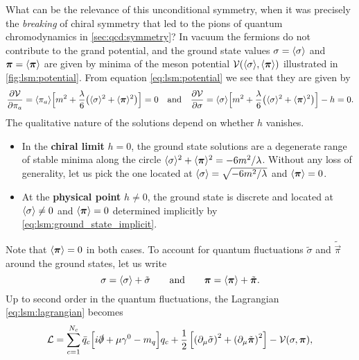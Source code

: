 What can be the relevance of this unconditional symmetry,
when it was precisely the \emph{breaking} of chiral symmetry that led to the pions of quantum chromodynamics in \cref{sec:qcd:symmetry}?
In vacuum the fermions do not contribute to the grand potential,
and the ground state values $\sigma = \langle \sigma \rangle$ and ${\bm{\pi}} = \langle {\bm{\pi}} \rangle$ are given by minima of the meson potential $\mathcal{V}(\langle \sigma \rangle,\langle {\bm{\pi}} \rangle)$ illustrated in \cref{fig:lsm:potential}.
From equation \eqref{eq:lsm:potential} we see that they are given by
\begin{equation}
	\pdv{\mathcal{V}}{\pi_a} = \langle \pi_a \rangle \Big[ m^2 + \frac{\lambda}{6} \big(\langle \sigma \rangle^2 + \langle {\bm{\pi}} \rangle^2\big) \Big] = 0
	\quad \text{and} \quad
	\pdv{\mathcal{V}}{\sigma} = \langle \sigma \rangle \Big[ m^2 + \frac{\lambda}{6} \big(\langle \sigma \rangle^2 + \langle {\bm{\pi}} \rangle^2\big) \Big] - h = 0.
\label{eq:lsm:ground_state_implicit}
\end{equation}
The qualitative nature of the solutions depend on whether $h$ vanishes.
\begin{itemize}
\item In the \textbf{chiral limit} $h=0$,
      the ground state solutions are a degenerate range of stable minima along the circle $\langle \sigma \rangle^2+\langle {\bm{\pi}} \rangle^2=-6m^2/\lambda$.
      Without any loss of generality, let us pick the one located at $\langle \sigma \rangle = \sqrt{-6m^2/\lambda}$ and $\langle {\bm{\pi}} \rangle=0$.
\item At the \textbf{physical point} $h \neq 0$,
      the ground state is discrete and located at $\langle \sigma \rangle \neq 0$ and $\langle {\bm{\pi}} \rangle=0$ determined implicitly by \eqref{eq:lsm:ground_state_implicit}.
\end{itemize}
Note that $\langle {\bm{\pi}} \rangle = 0$ in both cases.
To account for quantum fluctuations $\tilde{\sigma}$ and $\tilde{\vec{\pi}}$ around the ground states, let us write
\begin{equation}
	\sigma = \langle \sigma \rangle + \tilde{\sigma}
	\qquad \text{and} \qquad
	{\bm{\pi}} = \langle {\bm{\pi}} \rangle + \tilde{{\bm{\pi}}}.
\end{equation}
Up to second order in the quantum fluctuations,
the Lagrangian \eqref{eq:lsm:lagrangian} becomes
\begin{equation}
	\lagr = \sum_{c=1}^{N_c} \bar{q}_c \Big[ i \slashed\partial + \mu \gamma^0 - m_q \Big] q_c
	      + \frac12 \left[ \left( \partial_\mu \tilde{\sigma} \right)^2 + \left( \partial_\mu \tilde{\vec\pi} \right)^2 \right] - \pot(\sigma,\vec\pi) , %
\end{equation}
